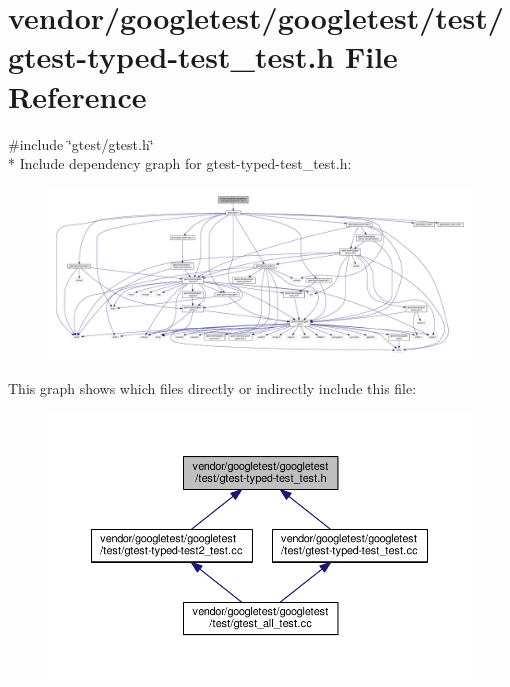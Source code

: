 \hypertarget{gtest-typed-test__test_8h}{}\section{vendor/googletest/googletest/test/gtest-\/typed-\/test\+\_\+test.h File Reference}
\label{gtest-typed-test__test_8h}
{\ttfamily \#include \char`\"{}gtest/gtest.\+h\char`\"{}}\\*
Include dependency graph for gtest-\/typed-\/test\+\_\+test.h\+:\nopagebreak
\begin{figure}[H]
\begin{center}
\leavevmode
\includegraphics[width=350pt]{gtest-typed-test__test_8h__incl}
\end{center}
\end{figure}
This graph shows which files directly or indirectly include this file\+:\nopagebreak
\begin{figure}[H]
\begin{center}
\leavevmode
\includegraphics[width=350pt]{gtest-typed-test__test_8h__dep__incl}
\end{center}
\end{figure}
